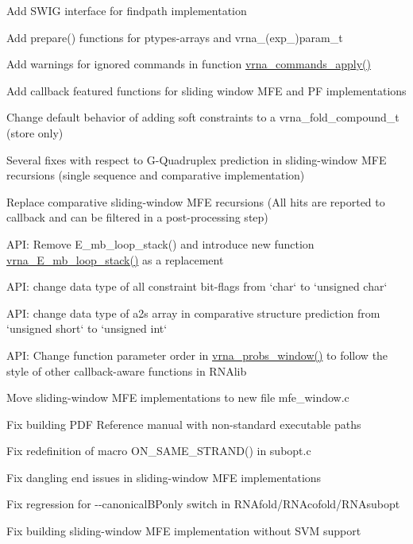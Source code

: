 \begin{DoxyItemize}
\item Add S\+W\+IG interface for findpath implementation
\item Add prepare() functions for ptypes-\/arrays and vrna\+\_\+(exp\+\_\+)param\+\_\+t
\item Add warnings for ignored commands in function \hyperlink{group__file__utils_ga5e993fc4b9602af73aaaab4d3b3cd9a9}{vrna\+\_\+commands\+\_\+apply()}
\item Add callback featured functions for sliding window M\+FE and PF implementations
\item Change default behavior of adding soft constraints to a vrna\+\_\+fold\+\_\+compound\+\_\+t (store only)
\item Several fixes with respect to G-\/\+Quadruplex prediction in sliding-\/window M\+FE recursions (single sequence and comparative implementation)
\item Replace comparative sliding-\/window M\+FE recursions (All hits are reported to callback and can be filtered in a post-\/processing step)
\item A\+PI\+: Remove E\+\_\+mb\+\_\+loop\+\_\+stack() and introduce new function \hyperlink{group__loops_ga73f048d35475e1d8f50b7d4ac6a2aeb6}{vrna\+\_\+\+E\+\_\+mb\+\_\+loop\+\_\+stack()} as a replacement
\item A\+PI\+: change data type of all constraint bit-\/flags from `char` to `unsigned char`
\item A\+PI\+: change data type of a2s array in comparative structure prediction from `unsigned short` to `unsigned int`
\item A\+PI\+: Change function parameter order in \hyperlink{group__local__pf__fold_ga70ec33810fa17a9f67a7c59f156d0137}{vrna\+\_\+probs\+\_\+window()} to follow the style of other callback-\/aware functions in R\+N\+Alib
\item Move sliding-\/window M\+FE implementations to new file mfe\+\_\+window.\+c
\item Fix building P\+DF Reference manual with non-\/standard executable paths
\item Fix redefinition of macro O\+N\+\_\+\+S\+A\+M\+E\+\_\+\+S\+T\+R\+A\+N\+D() in subopt.\+c
\item Fix dangling end issues in sliding-\/window M\+FE implementations
\item Fix regression for -\/-\/canonical\+B\+Ponly switch in R\+N\+Afold/\+R\+N\+Acofold/\+R\+N\+Asubopt
\item Fix building sliding-\/window M\+FE implementation without S\+VM support

\end{DoxyItemize}
